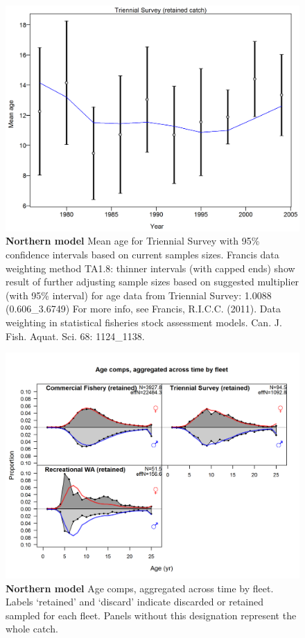 \documentclass[12pt,]{article}
\begin{document}
\begin{figure}[htbp]
\centering
\includegraphics{./tex2pdf.8516/bd1df94a0c7fc344b6b346e60f8d58fa142294ba.png}
\caption{\textbf{Northern model} Mean age for Triennial Survey with 95\%
confidence intervals based on current samples sizes. Francis data
weighting method TA1.8: thinner intervals (with capped ends) show result
of further adjusting sample sizes based on suggested multiplier (with
95\% interval) for age data from Triennial Survey: 1.0088
(0.606\_3.6749) For more info, see Francis, R.I.C.C. (2011). Data
weighting in statistical fisheries stock assessment models. Can. J.
Fish. Aquat. Sci. 68: 1124\_1138.
\label{fig:mod1_13_comp_agefit_data_weighting_TA1.8_Triennial Survey}}
\end{figure}

\begin{figure}[htbp]
\centering
\includegraphics{./r4ss/plots_mod1/comp_agefit__aggregated_across_time.png}
\caption{\textbf{Northern model} Age comps, aggregated across time by
fleet. Labels `retained' and `discard' indicate discarded or retained
sampled for each fleet. Panels without this designation represent the
whole catch. \label{fig:mod1_14_comp_agefit__aggregated_across_time}}
\end{figure}
\end{document}
